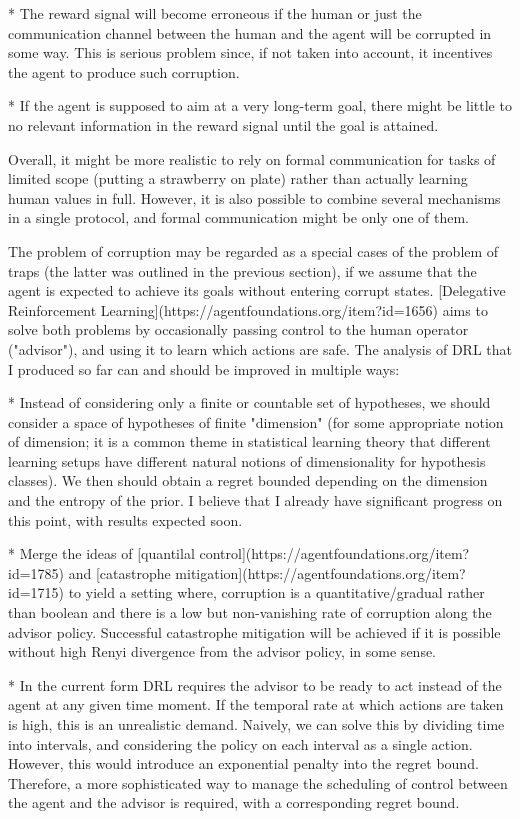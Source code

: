 \documentclass[a4paper]{article}
\begin{document}
* The reward signal will become erroneous if the human or just the communication channel between the human and the agent will be corrupted in some way. This is serious problem since, if not taken into account, it incentives the agent to produce such corruption.

* If the agent is supposed to aim at a very long-term goal, there might be little to no relevant information in the reward signal until the goal is attained.

Overall, it might be more realistic to rely on formal communication for tasks of limited scope (putting a strawberry on plate) rather than actually learning human values in full. However, it is also possible to combine several mechanisms in a single protocol, and formal communication might be only one of them.

The problem of corruption may be regarded as a special cases of the problem of traps (the latter was outlined in the previous section), if we assume that the agent is expected to achieve its goals without entering corrupt states. [Delegative Reinforcement Learning](https://agentfoundations.org/item?id=1656) aims to solve both problems by occasionally passing control to the human operator ("advisor"), and using it to learn which actions are safe. The analysis of DRL that I produced so far can and should be improved in multiple ways:

* Instead of considering only a finite or countable set of hypotheses, we should consider a space of hypotheses of finite "dimension" (for some appropriate notion of dimension; it is a common theme in statistical learning theory that different learning setups have different natural notions of dimensionality for hypothesis classes). We then should obtain a regret bounded depending on the dimension and the entropy of the prior. I believe that I already have significant progress on this point, with results expected soon.

* Merge the ideas of [quantilal control](https://agentfoundations.org/item?id=1785) and [catastrophe mitigation](https://agentfoundations.org/item?id=1715) to yield a setting where, corruption is a quantitative/gradual rather than boolean and there is a low but non-vanishing rate of corruption along the advisor policy. Successful catastrophe mitigation will be achieved if it is possible without high Renyi divergence from the advisor policy, in some sense.

* In the current form DRL requires the advisor to be ready to act instead of the agent at any given time moment. If the temporal rate at which actions are taken is high, this is an unrealistic demand. Naively, we can solve this by dividing time into intervals, and considering the policy on each interval as a single action. However, this would introduce an exponential penalty into the regret bound. Therefore, a more sophisticated way to manage the scheduling of control between the agent and the advisor is required, with a corresponding regret bound.
\end{document}
